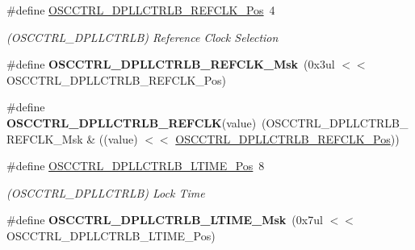 \begin{DoxyCompactItemize}
\item 
\hypertarget{group___s_a_m_l21___o_s_c_c_t_r_l_gad0796705a34fa0f49ef3bd5384a9bcb7}{}\#define \hyperlink{group___s_a_m_l21___o_s_c_c_t_r_l_gad0796705a34fa0f49ef3bd5384a9bcb7}{O\+S\+C\+C\+T\+R\+L\+\_\+\+D\+P\+L\+L\+C\+T\+R\+L\+B\+\_\+\+R\+E\+F\+C\+L\+K\+\_\+\+Pos}~4\label{group___s_a_m_l21___o_s_c_c_t_r_l_gad0796705a34fa0f49ef3bd5384a9bcb7}

\begin{DoxyCompactList}\small\item\em (O\+S\+C\+C\+T\+R\+L\+\_\+\+D\+P\+L\+L\+C\+T\+R\+L\+B) Reference Clock Selection \end{DoxyCompactList}\item 
\hypertarget{group___s_a_m_l21___o_s_c_c_t_r_l_gada40fbe3bdb100246a2fe434ff81b2ac}{}\#define {\bfseries O\+S\+C\+C\+T\+R\+L\+\_\+\+D\+P\+L\+L\+C\+T\+R\+L\+B\+\_\+\+R\+E\+F\+C\+L\+K\+\_\+\+Msk}~(0x3ul $<$$<$ O\+S\+C\+C\+T\+R\+L\+\_\+\+D\+P\+L\+L\+C\+T\+R\+L\+B\+\_\+\+R\+E\+F\+C\+L\+K\+\_\+\+Pos)\label{group___s_a_m_l21___o_s_c_c_t_r_l_gada40fbe3bdb100246a2fe434ff81b2ac}

\item 
\hypertarget{group___s_a_m_l21___o_s_c_c_t_r_l_ga956ea67bad3b64ea10811e85b8f826ae}{}\#define {\bfseries O\+S\+C\+C\+T\+R\+L\+\_\+\+D\+P\+L\+L\+C\+T\+R\+L\+B\+\_\+\+R\+E\+F\+C\+L\+K}(value)~(O\+S\+C\+C\+T\+R\+L\+\_\+\+D\+P\+L\+L\+C\+T\+R\+L\+B\+\_\+\+R\+E\+F\+C\+L\+K\+\_\+\+Msk \& ((value) $<$$<$ \hyperlink{group___s_a_m_l21___o_s_c_c_t_r_l_gad0796705a34fa0f49ef3bd5384a9bcb7}{O\+S\+C\+C\+T\+R\+L\+\_\+\+D\+P\+L\+L\+C\+T\+R\+L\+B\+\_\+\+R\+E\+F\+C\+L\+K\+\_\+\+Pos}))\label{group___s_a_m_l21___o_s_c_c_t_r_l_ga956ea67bad3b64ea10811e85b8f826ae}

\item 
\hypertarget{group___s_a_m_l21___o_s_c_c_t_r_l_ga548d60cb7bc67169f8aae58e9172405d}{}\#define \hyperlink{group___s_a_m_l21___o_s_c_c_t_r_l_ga548d60cb7bc67169f8aae58e9172405d}{O\+S\+C\+C\+T\+R\+L\+\_\+\+D\+P\+L\+L\+C\+T\+R\+L\+B\+\_\+\+L\+T\+I\+M\+E\+\_\+\+Pos}~8\label{group___s_a_m_l21___o_s_c_c_t_r_l_ga548d60cb7bc67169f8aae58e9172405d}

\begin{DoxyCompactList}\small\item\em (O\+S\+C\+C\+T\+R\+L\+\_\+\+D\+P\+L\+L\+C\+T\+R\+L\+B) Lock Time \end{DoxyCompactList}\item 
\hypertarget{group___s_a_m_l21___o_s_c_c_t_r_l_gabc2cb7ea8b4b54e2aec1cd37fd3585c0}{}\#define {\bfseries O\+S\+C\+C\+T\+R\+L\+\_\+\+D\+P\+L\+L\+C\+T\+R\+L\+B\+\_\+\+L\+T\+I\+M\+E\+\_\+\+Msk}~(0x7ul $<$$<$ O\+S\+C\+C\+T\+R\+L\+\_\+\+D\+P\+L\+L\+C\+T\+R\+L\+B\+\_\+\+L\+T\+I\+M\+E\+\_\+\+Pos)\label{group___s_a_m_l21___o_s_c_c_t_r_l_gabc2cb7ea8b4b54e2aec1cd37fd3585c0}


\end{DoxyCompactItemize}
